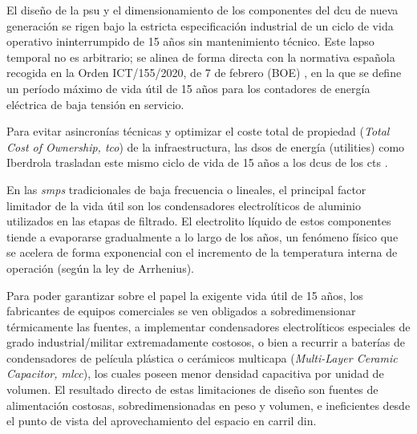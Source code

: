 El diseño de la \gls{psu} y el dimensionamiento de los componentes del \gls{dcu} de nueva generación se rigen bajo la estricta especificación industrial de un ciclo de vida operativo ininterrumpido de 15 años sin mantenimiento técnico. Este lapso temporal no es arbitrario; se alinea de forma directa con la normativa española recogida en la Orden ICT/155/2020, de 7 de febrero (BOE) \cite{BOE_ICT155_2020}, en la que se define un período máximo de vida útil de 15 años para los contadores de energía eléctrica de baja tensión en servicio. 


Para evitar asincronías técnicas y optimizar el coste total de propiedad (\textit{Total Cost of Ownership, \gls{tco}}) de la infraestructura, las \glspl{dso} de energía (utilities) como Iberdrola trasladan este mismo ciclo de vida de 15 años a los \glspl{dcu} de los \glspl{ct} \cite{WorldBank_AMI_Survey}.

En las \textit{\gls{smps}} tradicionales de baja frecuencia o lineales, el principal factor limitador de la vida útil son los condensadores electrolíticos de aluminio utilizados en las etapas de filtrado. El electrolito líquido de estos componentes tiende a evaporarse gradualmente a lo largo de los años, un fenómeno físico que se acelera de forma exponencial con el incremento de la temperatura interna de operación (según la ley de Arrhenius).

Para poder garantizar sobre el papel la exigente vida útil de 15 años, los fabricantes de equipos comerciales se ven obligados a sobredimensionar térmicamente las fuentes, a implementar condensadores electrolíticos especiales de grado industrial/militar extremadamente costosos, o bien a recurrir a baterías de condensadores de película plástica o cerámicos multicapa (\textit{Multi-Layer Ceramic Capacitor, \gls{mlcc}}), los cuales poseen menor densidad capacitiva por unidad de volumen. El resultado directo de estas limitaciones de diseño son fuentes de alimentación costosas, sobredimensionadas en peso y volumen, e ineficientes desde el punto de vista del aprovechamiento del espacio en carril \gls{din}.

